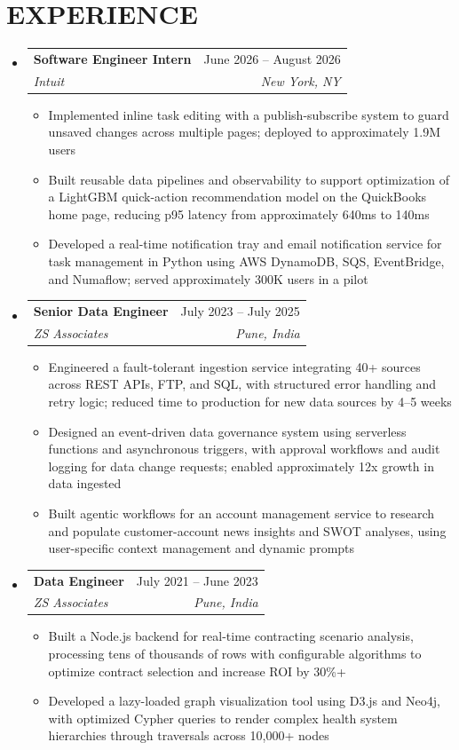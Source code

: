 \documentclass[letterpaper,11pt]{article}
\makeatletter
\newcommand{\resumeItem}[1]{
  \item\small{
    {#1 \vspace{-2pt}}
  }
}
\newcommand{\resumeSubheading}[4]{
  \vspace{-2pt}\item
    \begin{tabular*}{0.97\textwidth}[t]{l@{\extracolsep{\fill}}r}
      \textbf{#1} & #2 \\
      \textit{\small#3} & \textit{\small #4} \\
    \end{tabular*}\vspace{-7pt}
}
\newcommand{\resumeSubHeadingListStart}{\begin{itemize}[leftmargin=0.15in, label={}]}
\newcommand{\resumeSubHeadingListEnd}{\end{itemize}}
\newcommand{\resumeItemListStart}{\begin{itemize}}
\newcommand{\resumeItemListEnd}{\end{itemize}\vspace{-5pt}}
\newenvironment{entries}{\resumeSubHeadingListStart}{\resumeSubHeadingListEnd}
\newenvironment{job}[5][]{\resumeSubheading{#2}{#5}{#3}{#4}\resumeItemListStart}{\resumeItemListEnd}
\makeatother
\begin{document}
\section{EXPERIENCE}
  \begin{entries}

    \begin{job}[intuit-swe-intern]
      {Software Engineer Intern}{Intuit}{New York, NY}{June 2026 -- August 2026}
        \resumeItem{Implemented inline task editing with a publish-subscribe system to guard unsaved changes across multiple pages; deployed to approximately 1.9M users}
        \resumeItem{Built reusable data pipelines and observability to support optimization of a LightGBM quick-action recommendation model on the QuickBooks home page, reducing p95 latency from approximately 640ms to 140ms}
        \resumeItem{Developed a real-time notification tray and email notification service for task management in Python using AWS DynamoDB, SQS, EventBridge, and Numaflow; served approximately 300K users in a pilot}
    \end{job}

    \begin{job}[zs-senior-de]
      {Senior Data Engineer}{ZS Associates}{Pune, India}{July 2023 -- July 2025}
        \resumeItem{Engineered a fault-tolerant ingestion service integrating 40+ sources across REST APIs, FTP, and SQL, with structured error handling and retry logic; reduced time to production for new data sources by 4--5 weeks}
        \resumeItem{Designed an event-driven data governance system using serverless functions and asynchronous triggers, with approval workflows and audit logging for data change requests; enabled approximately 12x growth in data ingested}
        \resumeItem{Built agentic workflows for an account management service to research and populate customer-account news insights and SWOT analyses, using user-specific context management and dynamic prompts}
    \end{job}

    \begin{job}[zs-de]
      {Data Engineer}{ZS Associates}{Pune, India}{July 2021 -- June 2023}
        \resumeItem{Built a Node.js backend for real-time contracting scenario analysis, processing tens of thousands of rows with configurable algorithms to optimize contract selection and increase ROI by 30\%+}
        \resumeItem{Developed a lazy-loaded graph visualization tool using D3.js and Neo4j, with optimized Cypher queries to render complex health system hierarchies through traversals across 10,000+ nodes}
    \end{job}

  \end{entries}
\end{document}
